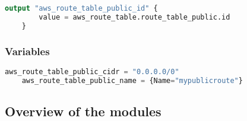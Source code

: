 \begin{lstlisting}[language=terraform]
    output "aws_route_table_public_id" {
        value = aws_route_table.route_table_public.id
    }
\end{lstlisting}

\subsubsection{
{Variables}}
\label{sec:Variables}

\begin{lstlisting}[language=terraform]
    aws_route_table_public_cidr = "0.0.0.0/0"
    aws_route_table_public_name = {Name="mypublicroute"}
\end{lstlisting}

\subsection{
{Overview of the modules}}
\label{sec:Overzicht van de modules}

